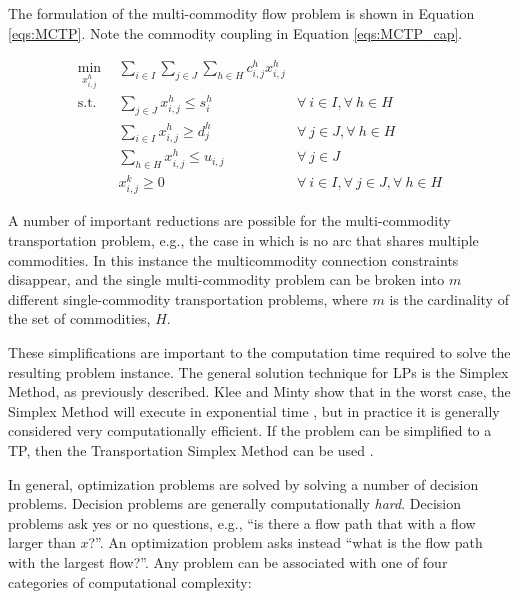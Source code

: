 The formulation of the multi-commodity flow problem is shown in Equation
\ref{eqs:MCTP}. Note the commodity coupling in Equation \ref{eqs:MCTP_cap}.

\begin{subequations}\label{eqs:MCTP}
  \begin{align}
    \min_{x_{i,j}^{h}} \:\: & 
    \sum_{i \in I}\sum_{j \in J}\sum_{h \in H} c_{i,j}^{h} x_{i,j}^{h}
    & \label{eqs:MCTP_obj} \\
    \text{s.t.} \:\: &
    \sum_{j \in J} x_{i,j}^{h} \leq s_{i}^{h}
    &
    \forall \: i \in I, \forall \: h \in H \label{eqs:MCTP_sup} \\
    &
    \sum_{i \in I} x_{i,j}^{h} \geq d_{j}^{h}
    & 
    \forall \: j \in J, \forall \: h \in H \label{eqs:MCTP_dem} \\
    &
    \sum_{h \in H} x_{i,j}^{h} \leq u_{i,j}
    & 
    \forall \: j \in J \label{eqs:MCTP_cap} \\
    &
    x_{i,j}^{k} \geq 0
    &
    \forall \: i \in I, \forall \: j \in J, \forall \: h \in H \label{eqs:MCTP_x}
  \end{align}
\end{subequations}

A number of important reductions are possible for the multi-commodity
transportation problem, e.g., the case in which is no arc that shares multiple
commodities. In this instance the multicommodity connection constraints
disappear, and the single multi-commodity problem can be broken into $m$
different single-commodity transportation problems, where $m$ is the cardinality
of the set of commodities, $H$. 

These simplifications are important to the computation time required to solve
the resulting problem instance. The general solution technique for LPs is the
Simplex Method, as previously described. Klee and Minty show that in the worst
case, the Simplex Method will execute in exponential time \cite{klee_good_1970},
but in practice it is generally considered very computationally efficient. If
the problem can be simplified to a TP, then the Transportation Simplex Method
can be used \cite{ahuja_network_1993}.

In general, optimization problems are solved by solving a number of decision
problems. Decision problems are generally computationally
\textit{hard}. Decision problems ask yes or no questions, e.g., ``is there a
flow path that with a flow larger than $x$?''. An optimization problem asks
instead ``what is the flow path with the largest flow?''. Any problem can be
associated with one of four categories of computational complexity:


